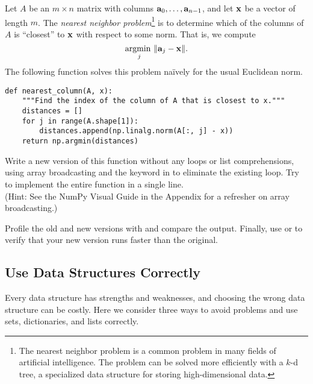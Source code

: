 \begin{problem} %
Let $A$ be an $m\times n$ matrix with columns $\mathbf{a}_0, \ldots, \mathbf{a}_{n-1}$, and let $\mathbf{x}$ be a vector of length $m$.
The \emph{nearest neighbor problem}\footnote{The nearest neighbor problem is a common problem in many fields of artificial intelligence. The problem can be solved more efficiently with a $k$-d tree, a specialized data structure for storing high-dimensional data.} is to determine which of the columns of $A$ is ``closest'' to $\mathbf{x}$ with respect to some norm.
That is, we compute
\[\underset{j}{\text{argmin }} \|\mathbf{a}_j - \mathbf{x}\|.\]
The following function solves this problem na\"ively for the usual Euclidean norm.
\begin{lstlisting}
def nearest_column(A, x):
    """Find the index of the column of A that is closest to x."""
    distances = []
    for j in range(A.shape[1]):
        distances.append(np.linalg.norm(A[:, j] - x))
    return np.argmin(distances)
\end{lstlisting}

Write a new version of this function without any loops or list comprehensions, using array broadcasting and the  keyword in  to eliminate the existing loop.
Try to implement the entire function in a single line.
\\(Hint: See the NumPy Visual Guide in the Appendix for a refresher on array broadcasting.)

Profile the old and new versions with  and compare the output.
Finally, use  or  to verify that your new version runs faster than the original.
\end{problem}

\subsection*{Use Data Structures Correctly} %

Every data structure has strengths and weaknesses, and choosing the wrong data structure can be costly.
Here we consider three ways to avoid problems and use sets, dictionaries, and lists correctly.

